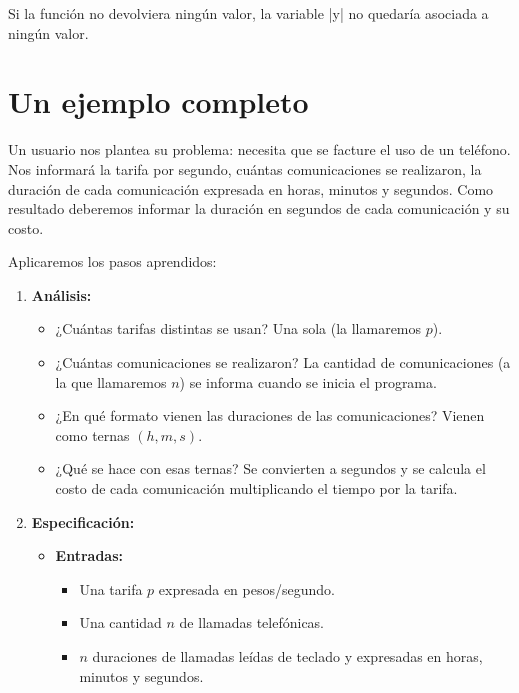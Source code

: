 Si la función no devolviera ningún valor, la variable |y| no quedaría asociada
a ningún valor.

\section{Un ejemplo completo}

\begin{problemac}
Un usuario nos plantea su problema: necesita que se facture el uso de un teléfono.
Nos informará la tarifa por segundo, cuántas comunicaciones se realizaron,
la duración de cada comunicación expresada en horas, minutos y segundos.
Como resultado deberemos informar la duración en segundos de cada comunicación y
su costo.
\end{problemac}

\begin{solucion}
Aplicaremos los pasos aprendidos:

\begin{enumerate}

\item {\bf Análisis: }
\begin{itemize}
\item ¿Cuántas tarifas distintas se usan? Una sola (la llamaremos $p$).
\item ¿Cuántas comunicaciones se realizaron? La cantidad de comunicaciones (a
la que llamaremos $n$) se informa cuando se inicia el programa.
\item ¿En qué formato vienen las duraciones de las comunicaciones? Vienen como
    ternas $(h, m, s)$.
\item ¿Qué se hace con esas ternas? Se convierten a segundos y se calcula el costo de cada
comunicación multiplicando el tiempo por la tarifa.
\end{itemize}

\item {\bf Especificación: }
\begin{itemize}

\item {\bf Entradas: }
\begin{itemize}
\item Una tarifa $p$ expresada en pesos/segundo.
\item Una cantidad $n$ de llamadas telefónicas.
\item $n$ duraciones de llamadas leídas de teclado y expresadas en horas, minutos y segundos.
\end{itemize}


\end{itemize}
\end{enumerate}
\end{solucion}

